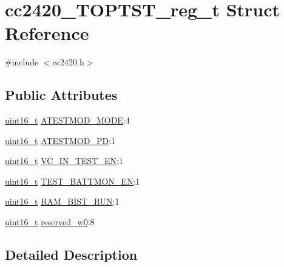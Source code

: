 \hypertarget{structcc2420___t_o_p_t_s_t__reg__t}{}\section{cc2420\+\_\+\+T\+O\+P\+T\+S\+T\+\_\+reg\+\_\+t Struct Reference}
\label{structcc2420___t_o_p_t_s_t__reg__t}


{\ttfamily \#include $<$cc2420.\+h$>$}

\subsection*{Public Attributes}
\begin{DoxyCompactItemize}
\item 
\hyperlink{_p_e___types_8h_a1f1825b69244eb3ad2c7165ddc99c956}{uint16\+\_\+t} \hyperlink{structcc2420___t_o_p_t_s_t__reg__t_ad8daaa08bcbd72912766bc13c8af36ba}{A\+T\+E\+S\+T\+M\+O\+D\+\_\+\+M\+O\+DE}\+:4
\item 
\hyperlink{_p_e___types_8h_a1f1825b69244eb3ad2c7165ddc99c956}{uint16\+\_\+t} \hyperlink{structcc2420___t_o_p_t_s_t__reg__t_ac12bec787431997736dacba6e32a34fc}{A\+T\+E\+S\+T\+M\+O\+D\+\_\+\+PD}\+:1
\item 
\hyperlink{_p_e___types_8h_a1f1825b69244eb3ad2c7165ddc99c956}{uint16\+\_\+t} \hyperlink{structcc2420___t_o_p_t_s_t__reg__t_acef5d905a0c25368df7b0b34870687ec}{V\+C\+\_\+\+I\+N\+\_\+\+T\+E\+S\+T\+\_\+\+EN}\+:1
\item 
\hyperlink{_p_e___types_8h_a1f1825b69244eb3ad2c7165ddc99c956}{uint16\+\_\+t} \hyperlink{structcc2420___t_o_p_t_s_t__reg__t_a4ac8e1eee922278b580146ca53e5a729}{T\+E\+S\+T\+\_\+\+B\+A\+T\+T\+M\+O\+N\+\_\+\+EN}\+:1
\item 
\hyperlink{_p_e___types_8h_a1f1825b69244eb3ad2c7165ddc99c956}{uint16\+\_\+t} \hyperlink{structcc2420___t_o_p_t_s_t__reg__t_a93da8870a250cdcbc8293d9375742553}{R\+A\+M\+\_\+\+B\+I\+S\+T\+\_\+\+R\+UN}\+:1
\item 
\hyperlink{_p_e___types_8h_a1f1825b69244eb3ad2c7165ddc99c956}{uint16\+\_\+t} \hyperlink{structcc2420___t_o_p_t_s_t__reg__t_a08a4077c02c86c8f3a8c3dfba534b804}{reserved\+\_\+w0}\+:8
\end{DoxyCompactItemize}


\subsection{Detailed Description}


